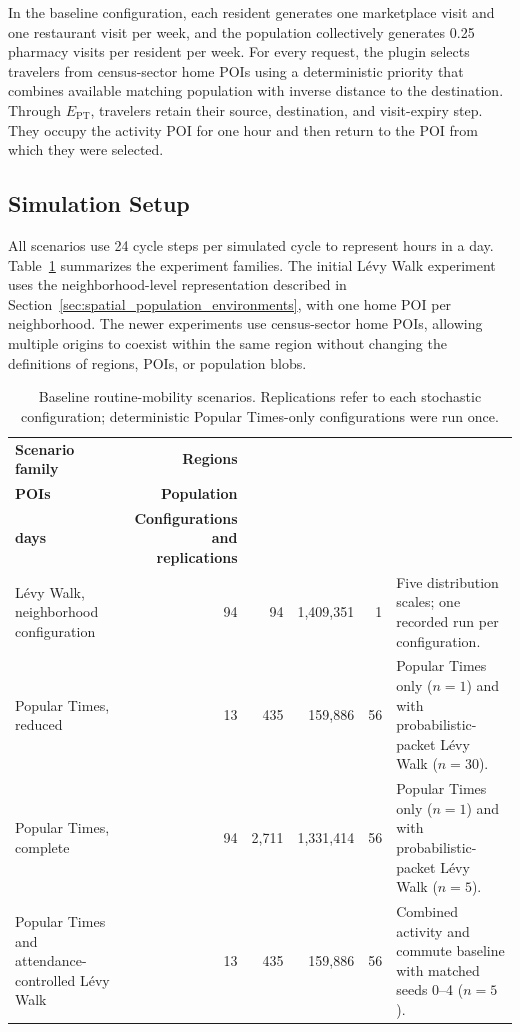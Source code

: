 In the baseline configuration, each resident generates one marketplace visit and one restaurant visit per week, and the population collectively generates 0.25 pharmacy visits per resident per week. For every request, the plugin selects travelers from census-sector home POIs using a deterministic priority that combines available matching population with inverse distance to the destination. Through $E_{\mathrm{PT}}$, travelers retain their source, destination, and visit-expiry step. They occupy the activity POI for one hour and then return to the POI from which they were selected. %

\subsection{Simulation Setup}
\label{sec:routine_mobility_setup}

All scenarios use 24 cycle steps per simulated cycle to represent hours in a day. Table~\ref{tbl:routine_mobility_scenarios} summarizes the experiment families. %
The initial L\'evy Walk experiment uses the neighborhood-level representation described in Section~\ref{sec:spatial_population_environments}, with one home POI per neighborhood. The newer experiments use census-sector home POIs, allowing multiple origins to coexist within the same region without changing the definitions of regions, POIs, or population blobs.

\begin{table}[ht]
\centering
\footnotesize
\caption{Baseline routine-mobility scenarios. Replications refer to each stochastic configuration; %
deterministic Popular Times-only configurations were run once.}
\label{tbl:routine_mobility_scenarios}
\begin{tabularx}{\linewidth}{@{}p{3.0cm}rrrrX@{}}
\toprule
\textbf{Scenario family} &
\textbf{Regions} &
\shortstack{\textbf{Home}\\\textbf{POIs}} &
\textbf{Population} &
\shortstack{\textbf{Simulated}\\\textbf{days}} &
\textbf{Configurations and replications} \\
\midrule
L\'evy Walk, neighborhood configuration
    & 94 & 94 & 1,409,351 & 1
    & Five distribution scales; one recorded run per configuration. \\
Popular Times, reduced
    & 13 & 435 & 159,886 & 56
    & Popular Times only ($n=1$) and with probabilistic-packet L\'evy Walk ($n=30$). \\
Popular Times, complete
    & 94 & 2,711 & 1,331,414 & 56
    & Popular Times only ($n=1$) and with probabilistic-packet L\'evy Walk ($n=5$). \\
Popular Times and attendance-controlled L\'evy Walk
    & 13 & 435 & 159,886 & 56
    & Combined activity and commute baseline with matched seeds 0--4 ($n=5$). \\
\bottomrule
\end{tabularx}
\end{table}

